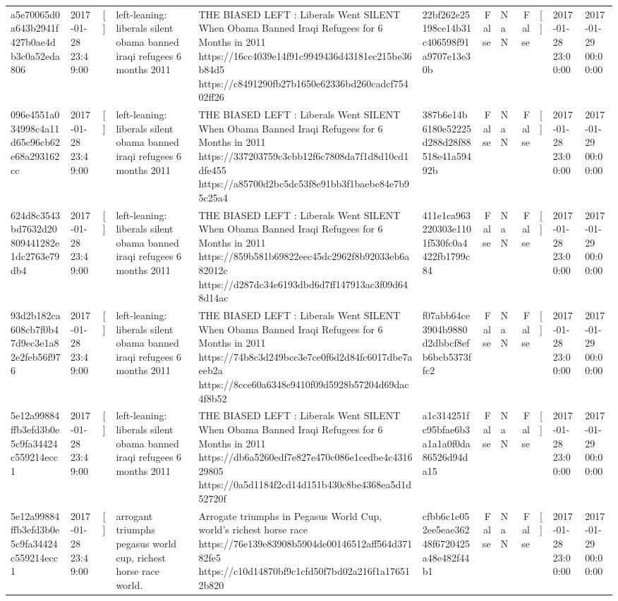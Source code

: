 \begin{tabular}{llllllrlrlll}
a5e70065d0a643b2941f427b0ae4db3c0a52eda806 & 2017-01-28 23:49:00 & [] & left-leaning: liberals silent obama banned iraqi refugees 6 months 2011 & THE BIASED LEFT : Liberals Went SILENT When Obama Banned Iraqi Refugees for 6 Months in 2011 https://16cc4039e14f91c9949436d43181ec215be36b84d5 https://c8491290fb27b1650e62336bd260cadcf75402ff26 & 22bf262e25198ce14b31c406598f91a9707e13e30b & False & NaN & False & [] & 2017-01-28 23:00:00 & 2017-01-29 00:00:00 \\
096e4551a034998c4a11d65c96cb62e68a293162cc & 2017-01-28 23:49:00 & [] & left-leaning: liberals silent obama banned iraqi refugees 6 months 2011 & THE BIASED LEFT : Liberals Went SILENT When Obama Banned Iraqi Refugees for 6 Months in 2011 https://337203759c3cbb12f6c7808da7f1d8d10cd1dfe455 https://a85700d2bc5dc53f8e91bb3f1baebe84e7b95c25a4 & 387b6e14b6180e52225d288d28f88518e41a59492b & False & NaN & False & [] & 2017-01-28 23:00:00 & 2017-01-29 00:00:00 \\
624d8c3543bd7632d20809441282e1dc2763e79db4 & 2017-01-28 23:49:00 & [] & left-leaning: liberals silent obama banned iraqi refugees 6 months 2011 & THE BIASED LEFT : Liberals Went SILENT When Obama Banned Iraqi Refugees for 6 Months in 2011 https://859b581b69822eec45dc2962f8b92033eb6a82012c https://d287dc34e6193dbd6d7ff147913ac3f09d648d14ac & 411e1ca963220303e1101f530fc0a4422fb1799c84 & False & NaN & False & [] & 2017-01-28 23:00:00 & 2017-01-29 00:00:00 \\
93d2b182ca608cb7f0b47d9ec3e1a82e2feb56f976 & 2017-01-28 23:49:00 & [] & left-leaning: liberals silent obama banned iraqi refugees 6 months 2011 & THE BIASED LEFT : Liberals Went SILENT When Obama Banned Iraqi Refugees for 6 Months in 2011 https://74b8c3d249bcc3e7ce0f6d2d84fc6017dbe7aeeb2a https://8cce60a6348e9410f09d5928b57204d69dac4f8b52 & f07abb64ce3904b9880d2dbbcf8efb6bcb5373ffc2 & False & NaN & False & [] & 2017-01-28 23:00:00 & 2017-01-29 00:00:00 \\
5e12a99884ffb3efd3b0e5c9fa34424c559214ecc1 & 2017-01-28 23:49:00 & [] & left-leaning: liberals silent obama banned iraqi refugees 6 months 2011 & THE BIASED LEFT : Liberals Went SILENT When Obama Banned Iraqi Refugees for 6 Months in 2011 https://db6a5260edf7e827e470c086e1cedbe4c431629805 https://0a5d1184f2cd14d151b430c8be4368ea5d1d52720f & a1c314251fc95bfae6b3a1a1a0f0da86526d94da15 & False & NaN & False & [] & 2017-01-28 23:00:00 & 2017-01-29 00:00:00 \\
5e12a99884ffb3efd3b0e5c9fa34424c559214ecc1 & 2017-01-28 23:49:00 & [] & arrogant triumphs pegasus world cup, richest horse race world. & Arrogate triumphs in Pegasus World Cup, world's richest horse race https://76e139e83908b5904de00146512aff564d37182fe5 https://c10d14870bf9c1cfd50f7bd02a216f1a176512b820 & cfbb6c1e052ee5eae36248f6720425a48e482f44b1 & False & NaN & False & [] & 2017-01-28 23:00:00 & 2017-01-29 00:00:00 \\

\end{tabular}
